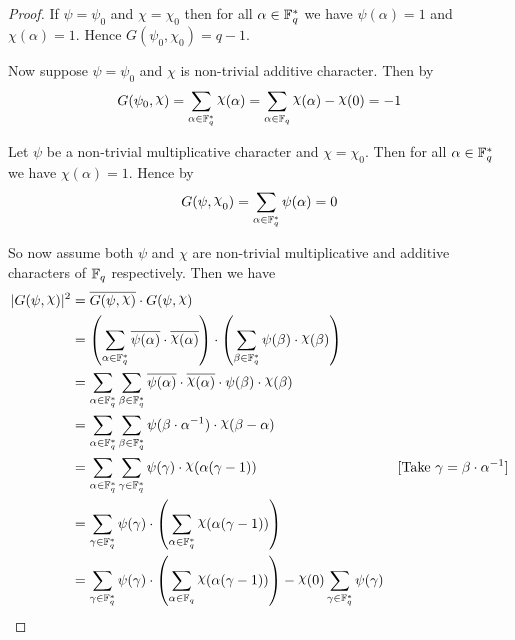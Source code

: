\begin{proof}
  If $\psi=\psi_0$ and $\chi=\chi_0$ then for all $\alpha\in\mathbb{F}_q^*$ we have $\psi(\alpha)=1$ and $\chi(\alpha)=1$. Hence $G(\psi_0,\chi_0)=q-1$.

  Now suppose $\psi=\psi_0$ and $\chi$ is non-trivial additive character. Then by  $$G(\psi_0,\chi)=\sum_{\alpha\in\bbF_q^*}\chi(\alpha)=\sum_{\alpha\in\bbF_q}\chi(\alpha)-\chi(0)=-1$$

  Let $\psi$ be a non-trivial multiplicative character and $\chi=\chi_0$. Then for all $\alpha\in\mathbb{F}_q^*$ we have $\chi(\alpha)=1$. Hence by $$G(\psi,\chi_0)=\sum_{\alpha\in\bbF_q^*}\psi(\alpha)=0$$

  So now assume both $\psi$ and $\chi$ are non-trivial multiplicative and additive characters of $\mathbb{F}_q$ respectively. Then we have \begin{align*}
    |G(\psi,\chi)|^2 & = \ov{G(\psi,\chi)}\cdot G(\psi,\chi)                                                                                                                                                    \\
                     & = \lt(\sum_{\alpha\in\bbF_q^*}\ov{\psi(\alpha)}\cdot \ov{\chi(\alpha)}\rt) \cdot \lt(\sum_{\beta\in\bbF_q^*}\psi(\beta)\cdot \chi(\beta) \rt)                                            \\
                     & = \sum_{\alpha\in\bbF_q^*}\sum_{\beta\in\bbF_q^*}\ov{\psi(\alpha)}\cdot \ov{\chi(\alpha)}\cdot \psi(\beta)\cdot \chi(\beta)                                                              \\
                     & = \sum_{\alpha\in\bbF_q^*}\sum_{\beta\in\bbF_q^*}\psi(\beta\cdot \alpha^{-1})\cdot \chi(\beta-\alpha)                                                                                    \\
                     & = \sum_{\alpha\in\bbF_q^*}\sum_{\gm\in\bbF_q^*}\psi(\gm)\cdot \chi(\alpha(\gm-1))                                                             & [\text{Take }\gm=\beta\cdot \alpha^{-1}] \\
                     & = \sum_{\gm\in\bbF_q^*}\psi(\gm)\cdot \lt(\sum_{\alpha\in\bbF_q^*}\chi(\alpha(\gm-1))\rt)                                                                                                \\
                     & = \sum_{\gm\in\bbF_q^*}\psi(\gm)\cdot \lt(\sum_{\alpha\in\bbF_q}\chi(\alpha(\gm-1))\rt) -\chi(0)\sum_{\gm\in\bbF_q^*}\psi(\gm)                                                           \\

\end{align*}
\end{proof}
